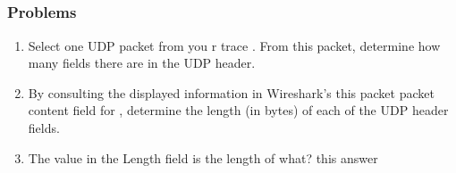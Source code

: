 \subsection{ }
    \subsubsection*{Problems}
    \begin{enumerate}[label=\bfseries Problem \arabic*:,leftmargin=*,labelindent=1em]
        \item Select one UDP packet from you r trace . From this packet, determine how many fields there are in the UDP header.\\[0.2mm]
        \soln
        \item By consulting the displayed information in Wireshark’s this packet packet content field for , 
        determine the length (in bytes) of each of the UDP header fields.\\[0.2mm]
        \soln
        \item The value in the Length field is the length of what? this answer\\[0.2mm]
        \soln

\end{enumerate}
